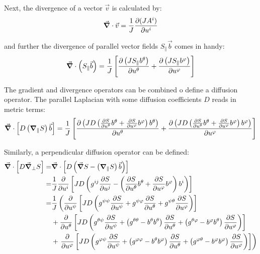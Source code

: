 Next, the divergence of a vector $\vec{v}$ is calculated by: 
\begin{align}
	\vec{\grad}\cdot\vec{v} = \frac{1}{J}\pdv{(JA^i)}{u^i} \label{eq:MetricDivergence}
\end{align}

and further the divergence of parallel vector fields $S_\parallel\vec{b}$ comes in handy: 
\begin{align}
	\vec{\grad}\cdot \left(S_\parallel\vec{b}\right) = \frac{1}{J}\left[\pdv{\left(J S_\parallel b^\theta\right)}{u^\theta} + \pdv{\left(J S_\parallel b^\varphi\right)}{u^\varphi}\right] \label{eq:MetricDivergenceParallel}
\end{align}

The gradient and divergence operators can be combined o define a diffusion operator. The parallel Laplacian with some diffusion coefficients $D$ reads in metric terms: 
\begin{align}
	\label{eq:MetricParallelDiffusion}
	\vec{\grad}\cdot\left[D\left(\grad_\parallel S\right)\vec{b}\right] = \frac{1}{J}\left[\pdv{\left(JD \left(\pdv{S}{u^\theta}b^\theta + \pdv{S}{u^\varphi}b^\varphi\right) b^\theta\right)}{u^\theta} + \pdv{\left(JD\left(\pdv{S}{u^\theta}b^\theta + \pdv{S}{u^\varphi}b^\varphi\right) b^\varphi\right)}{u^\varphi}\right]
\end{align}

Similarly, a perpendicular diffusion operator can be defined: 
\begin{align}
	\vec{\grad}\cdot\left[D\vec{\grad}_\perp S\right] =& \vec{\grad}\cdot\left[D\left(\vec{\grad} S - \left(\grad_\parallel S\right)\vec{b}\right)\right] \nonumber \\
	=& \frac{1}{J}\pdv{}{u^i}\left[JD\left(g^{ij}\pdv{S}{u^j} - \left(\pdv{S}{u^\theta}b^\theta + \pdv{S}{u^\varphi}b^\varphi\right)b^i\right)\right] \nonumber \\
	=& \frac{1}{J}\left(\pdv{}{u^\psi}\left[JD\left(g^{\psi\psi}\pdv{S}{u^\psi} + g^{\psi\varphi}\pdv{S}{u^\theta} + g^{\psi\theta}\pdv{S}{u^\varphi}\right)\right]      \right.\nonumber \\
	&+ \pdv{}{u^\theta}\left[JD\left(g^{\theta\psi}\pdv{S}{u^\psi} + \left(g^{\theta\theta} - b^\theta b^\theta\right)\pdv{S}{u^\theta} + \left(g^{\theta\varphi} - b^\varphi b^\theta\right)\pdv{S}{u^\varphi}\right)\right] \nonumber \\
	&+ \left. \pdv{}{u^\varphi}\left[JD\left(g^{\varphi\psi}\pdv{S}{u^\psi} + \left(g^{\varphi\varphi} - b^\theta b^\varphi\right)\pdv{S}{u^\theta} + \left(g^{\varphi\theta} - b^\varphi b^\varphi\right)\pdv{S}{u^\varphi}\right)\right]\right) \label{eq:MetricPerpendicularDiffusion}
\end{align}


